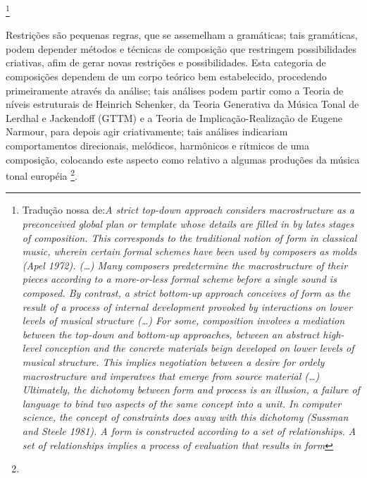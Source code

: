 \begin{citacao}
\footnote{Tradução nossa de:\textit{A strict top-down approach considers macrostructure as a preconceived global plan or template whose details are filled in by lates stages of composition. This corresponds to the traditional notion of form in classical music, wherein certain formal schemes have been used by composers as molds (Apel 1972). (\ldots) Many composers predetermine the macrostructure of their pieces according to a more-or-less formal scheme before a single sound is composed. By contrast, a strict bottom-up approach conceives of form as the result of a process of internal development provoked by interactions on lower levels of musical structure (\ldots) For some, composition involves a mediation between the top-down and bottom-up approaches, between an abstract high-level conception and the concrete materials beign developed on lower levels of musical structure. This implies negotiation between a desire for ordely macrostructure and imperatves that emerge from source material (\ldots) Ultimately, the dichotomy between form and process is an illusion, a failure of language to bind two aspects of the same concept into a unit. In computer science, the concept of constraints does away with this dichotomy (Sussman and Steele 1981). A form is constructed according to a set of relationships. A set of relationships implies a process of evaluation that results in form}}
\end{citacao}

Restrições são pequenas regras, que se assemelham a gramáticas; tais gramáticas, podem depender métodos e técnicas de composição que restringem possibilidades criativas, afim de gerar novas restrições e possibilidades. Esta categoria de composições dependem de um corpo teórico bem estabelecido, procedendo primeiramente através da análise; tais análises podem partir como a Teoria de níveis estruturais de Heinrich Schenker, da Teoria Generativa da Música Tonal de Lerdhal e Jackendoff  (GTTM) e a Teoria de Implicação-Realização de Eugene Narmour, para depois agir criativamente; tais análises indicariam comportamentos direcionais, melódicos, harmônicos e rítmicos de uma composição, colocando este aspecto como relativo a algumas produções da música tonal européia \footnote{}.

